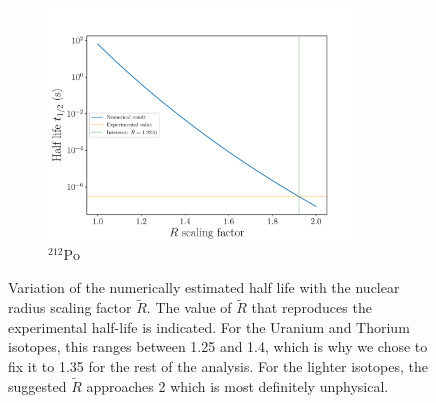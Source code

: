 \documentclass[a4paper,DIV=12,english]{scrartcl}
\begin{document}
\begin{figure}
\begin{subfigure}{0.49\textwidth}
        \includegraphics[width=0.9\textwidth]{../plots/R_dependence/R_po212.pdf}
        \caption{$^{212}\text{Po}$}
        \label{subfig:r_po212}
    \end{subfigure}
    \caption{Variation of the numerically estimated half life with the nuclear radius scaling factor $\tilde R$. The value of $\tilde R$ that reproduces the experimental half-life is indicated. For the Uranium and Thorium isotopes, this ranges between 1.25 and 1.4, which is why we chose to fix it to 1.35 for the rest of the analysis. For the lighter isotopes, the suggested $\tilde R$ approaches 2 which is most definitely unphysical.}
    \label{fig:r}
\end{figure}
\end{document}
